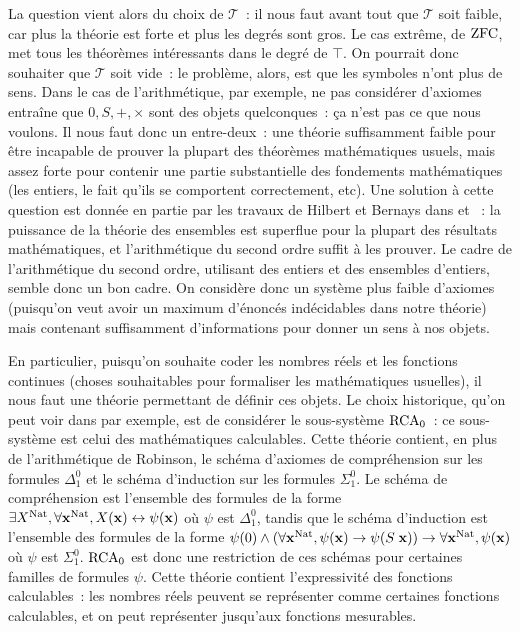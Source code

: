 \documentclass{article}
\begin{document}
La question vient alors du choix de $\mathcal T$~: il nous faut avant tout que $\mathcal T$ soit faible, car plus la théorie est forte et plus les degrés sont gros. Le cas extrême, de $\mathrm{ZFC}$, met tous les théorèmes intéressants dans le degré de $\top$. On pourrait donc souhaiter que $\mathcal T$ soit vide~: le problème, alors, est que les symboles n'ont plus de sens. Dans le cas de l'arithmétique, par exemple, ne pas considérer d'axiomes entraîne que $0,S,+,\times$ sont des objets quelconques~: ça n'est pas ce que nous voulons. Il nous faut donc un entre-deux~: une théorie suffisamment faible pour être incapable de prouver la plupart des théorèmes mathématiques usuels, mais assez forte pour contenir une partie substantielle des fondements mathématiques (les entiers, le fait qu'ils se comportent correctement, etc). Une solution à cette question est donnée en partie par les travaux de Hilbert et Bernays dans \cite{Hilbert1935-HILGDM-8} et \cite{Hilbert1974-HILGDM-5}~: la puissance de la théorie des ensembles est superflue pour la plupart des résultats mathématiques, et l'arithmétique du second ordre suffit à les prouver. Le cadre de l'arithmétique du second ordre, utilisant des entiers et des ensembles d'entiers, semble donc un bon cadre. On considère donc un système plus faible d'axiomes (puisqu'on veut avoir un maximum d'énoncés indécidables dans notre théorie) mais contenant suffisamment d'informations pour donner un sens à nos objets.

En particulier, puisqu'on souhaite coder les nombres réels et les fonctions continues (choses souhaitables pour formaliser les mathématiques usuelles), il nous faut une théorie permettant de définir ces objets. Le choix historique, qu'on peut voir dans \cite{Simpson_2009} par exemple, est de considérer le sous-système $\mathrm{RCA}_0$~: ce sous-système est celui des mathématiques calculables. Cette théorie contient, en plus de l'arithmétique de Robinson, le schéma d'axiomes de compréhension sur les formules $\Delta_1^0$ et le schéma d'induction sur les formules $\Sigma_1^0$. Le schéma de compréhension est l'ensemble des formules de la forme $\exists X^{\mathrm{Nat}}, \forall \mathbf{x}^{\mathrm{Nat}}, X(\mathbf{x}) \leftrightarrow \psi(\mathbf{x})$ où $\psi$ est $\Delta_1^0$, tandis que le schéma d'induction est l'ensemble des formules de la forme $\psi(0)\land (\forall \mathbf{x}^{\mathrm{Nat}}, \psi(\mathbf{x}) \to \psi(S\;\mathbf{x})) \to \forall \mathbf{x}^{\mathrm{Nat}}, \psi(\mathbf{x})$ où $\psi$ est $\Sigma_1^0$. $\mathrm{RCA}_0$ est donc une restriction de ces schémas pour certaines familles de formules $\psi$. Cette théorie contient l'expressivité des fonctions calculables~: les nombres réels peuvent se représenter comme certaines fonctions calculables, et on peut représenter jusqu'aux fonctions mesurables.
\end{document}
